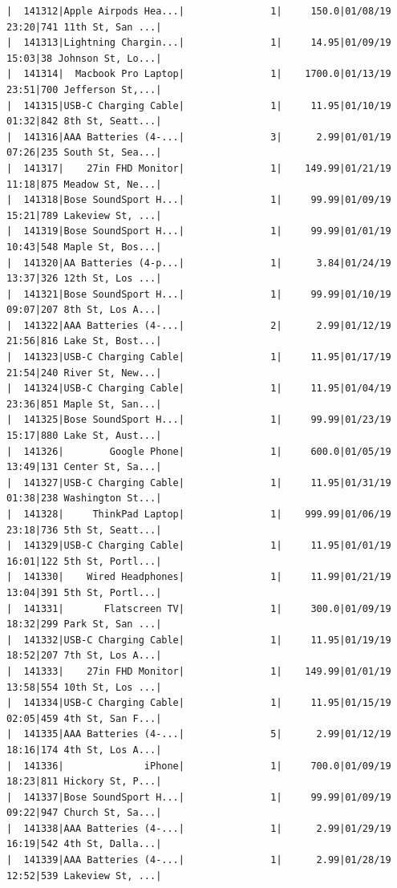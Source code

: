 \documentclass[
  letterpaper,
  DIV=11,
  numbers=noendperiod]{scrartcl}
\begin{document}
\begin{verbatim}
|  141312|Apple Airpods Hea...|               1|     150.0|01/08/19 23:20|741 11th St, San ...|
|  141313|Lightning Chargin...|               1|     14.95|01/09/19 15:03|38 Johnson St, Lo...|
|  141314|  Macbook Pro Laptop|               1|    1700.0|01/13/19 23:51|700 Jefferson St,...|
|  141315|USB-C Charging Cable|               1|     11.95|01/10/19 01:32|842 8th St, Seatt...|
|  141316|AAA Batteries (4-...|               3|      2.99|01/01/19 07:26|235 South St, Sea...|
|  141317|    27in FHD Monitor|               1|    149.99|01/21/19 11:18|875 Meadow St, Ne...|
|  141318|Bose SoundSport H...|               1|     99.99|01/09/19 15:21|789 Lakeview St, ...|
|  141319|Bose SoundSport H...|               1|     99.99|01/01/19 10:43|548 Maple St, Bos...|
|  141320|AA Batteries (4-p...|               1|      3.84|01/24/19 13:37|326 12th St, Los ...|
|  141321|Bose SoundSport H...|               1|     99.99|01/10/19 09:07|207 8th St, Los A...|
|  141322|AAA Batteries (4-...|               2|      2.99|01/12/19 21:56|816 Lake St, Bost...|
|  141323|USB-C Charging Cable|               1|     11.95|01/17/19 21:54|240 River St, New...|
|  141324|USB-C Charging Cable|               1|     11.95|01/04/19 23:36|851 Maple St, San...|
|  141325|Bose SoundSport H...|               1|     99.99|01/23/19 15:17|880 Lake St, Aust...|
|  141326|        Google Phone|               1|     600.0|01/05/19 13:49|131 Center St, Sa...|
|  141327|USB-C Charging Cable|               1|     11.95|01/31/19 01:38|238 Washington St...|
|  141328|     ThinkPad Laptop|               1|    999.99|01/06/19 23:18|736 5th St, Seatt...|
|  141329|USB-C Charging Cable|               1|     11.95|01/01/19 16:01|122 5th St, Portl...|
|  141330|    Wired Headphones|               1|     11.99|01/21/19 13:04|391 5th St, Portl...|
|  141331|       Flatscreen TV|               1|     300.0|01/09/19 18:32|299 Park St, San ...|
|  141332|USB-C Charging Cable|               1|     11.95|01/19/19 18:52|207 7th St, Los A...|
|  141333|    27in FHD Monitor|               1|    149.99|01/01/19 13:58|554 10th St, Los ...|
|  141334|USB-C Charging Cable|               1|     11.95|01/15/19 02:05|459 4th St, San F...|
|  141335|AAA Batteries (4-...|               5|      2.99|01/12/19 18:16|174 4th St, Los A...|
|  141336|              iPhone|               1|     700.0|01/09/19 18:23|811 Hickory St, P...|
|  141337|Bose SoundSport H...|               1|     99.99|01/09/19 09:22|947 Church St, Sa...|
|  141338|AAA Batteries (4-...|               1|      2.99|01/29/19 16:19|542 4th St, Dalla...|
|  141339|AAA Batteries (4-...|               1|      2.99|01/28/19 12:52|539 Lakeview St, ...|

\end{verbatim}
\end{document}
